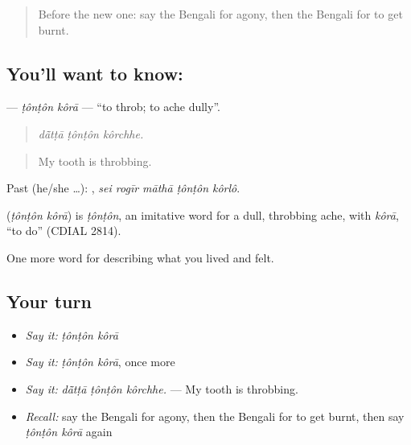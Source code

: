 \label{lesson:BN-C477-tonton-kora}



\begin{quote}
Before the new one: say the Bengali for agony, then the Bengali for to get burnt.
\end{quote}

\subsection*{You'll want to know:  }
\textbf{ } — \emph{ṭônṭôn kôrā} — \textquotedblleft{}to throb; to ache dully\textquotedblright{}.

\begin{quote}
  
\end{quote}

\begin{quote}
\emph{dā̃tṭā ṭônṭôn kôrchhe.}
\end{quote}

\begin{quote}
My tooth is throbbing.
\end{quote}

Past (he/she …):     , \emph{sei rogīr māthā ṭônṭôn kôrlô}.

\begin{cousinweb}
\textbf{ } (\emph{ṭônṭôn kôrā}) is \emph{ṭônṭôn}, an imitative word for a dull, throbbing ache, with \emph{kôrā}, \textquotedblleft{}to do\textquotedblright{} (CDIAL 2814).
\end{cousinweb}

\begin{grammarlens}[title={What you've built}]
One more word for describing what you lived and felt.
\end{grammarlens}

\subsection*{Your turn}
\begin{itemize}
\raggedright
  \item \emph{Say it:} \emph{ṭônṭôn kôrā}
  \item \emph{Say it:} \emph{ṭônṭôn kôrā}, once more
  \item \emph{Say it:} \emph{dā̃tṭā ṭônṭôn kôrchhe.} — My tooth is throbbing.
  \item \emph{Recall:} say the Bengali for agony, then the Bengali for to get burnt, then say \emph{ṭônṭôn kôrā} again
\end{itemize}

